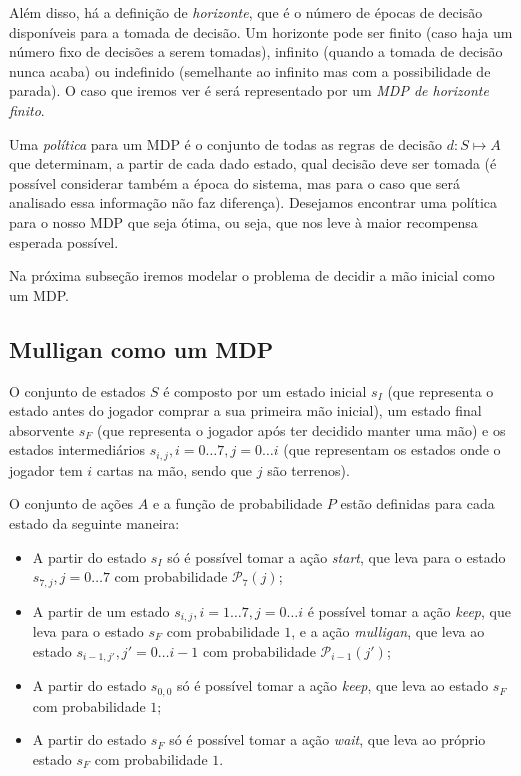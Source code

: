 \documentclass{book}
\begin{document}
Além disso, há a definição de \textit{horizonte}, que é o número de épocas de decisão disponíveis para a tomada de decisão. Um horizonte pode ser finito (caso haja
um número fixo de decisões a serem tomadas), infinito (quando a tomada de decisão nunca acaba) ou indefinido (semelhante ao infinito mas com a possibilidade de parada).
O caso que iremos ver é será representado por um \textit{MDP de horizonte finito}.

Uma \textit{política} para um MDP é o conjunto de todas as regras de decisão $d: S \mapsto A$ que determinam, a partir de cada dado estado, qual decisão deve ser tomada
(é possível considerar também a época do sistema, mas para o caso que será analisado essa informação não faz diferença). Desejamos encontrar uma política para o
nosso MDP que seja ótima, ou seja, que nos leve à maior recompensa esperada possível.

Na próxima subseção iremos modelar o problema de decidir a mão inicial como um MDP.

\subsection{Mulligan como um MDP}


O conjunto de estados $S$ é composto por um estado inicial $s_I$ (que representa o estado antes do jogador comprar a sua primeira mão inicial),
um estado final absorvente $s_F$ (que representa o jogador após ter decidido manter uma mão) e os estados intermediários
$s_{i, j}, i=0 \ldots 7, j=0 \ldots i$ (que representam os estados onde o jogador tem $i$ cartas na mão, sendo que $j$ são terrenos).

O conjunto de ações $A$ e a função de probabilidade $P$ estão definidas para cada estado da seguinte maneira:
\begin{itemize}
  \item A partir do estado $s_I$ só é possível tomar a ação \textit{start}, que leva para o estado $s_{7, j}, j = 0 \ldots 7$ com probabilidade $\mathcal{P}_7(j)$;
  \item A partir de um estado $s_{i, j}, i=1 \ldots 7, j=0 \ldots i$ é possível tomar a ação \textit{keep}, que leva para o estado $s_F$ com probabilidade $1$,
  e a ação \textit{mulligan}, que leva ao estado $s_{i-1, j'}, j'=0 \ldots i-1$ com probabilidade $\mathcal{P}_{i-1}(j')$;
  \item A partir do estado $s_{0, 0}$ só é possível tomar a ação \textit{keep}, que leva ao estado $s_F$ com probabilidade $1$;
  \item A partir do estado $s_F$ só é possível tomar a ação \textit{wait}, que leva ao próprio estado $s_F$ com probabilidade $1$.
\end{itemize}
\end{document}
